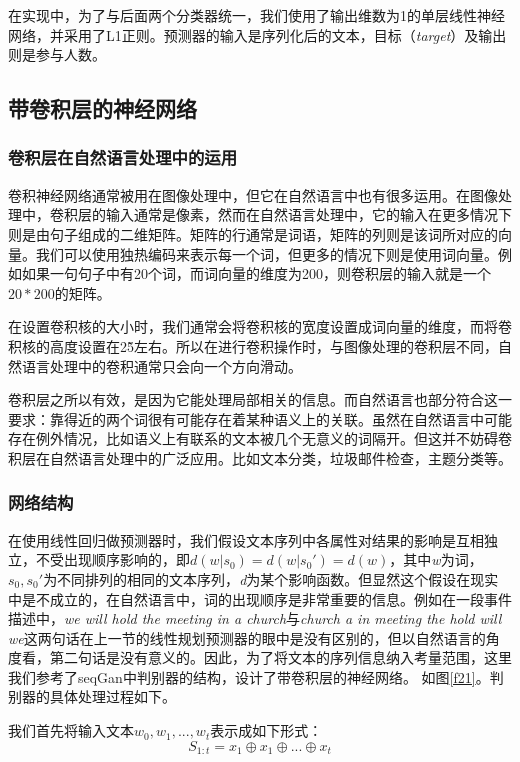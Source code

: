 在实现中，为了与后面两个分类器统一，我们使用了输出维数为1的单层线性神经网络，并采用了L1正则。预测器的输入是序列化后的文本，目标（\textit{target}）及输出则是参与人数。


\subsection{带卷积层的神经网络}
\subsubsection{卷积层在自然语言处理中的运用}
卷积神经网络通常被用在图像处理中，但它在自然语言中也有很多运用。在图像处理中，卷积层的输入通常是像素，然而在自然语言处理中，它的输入在更多情况下则是由句子组成的二维矩阵。矩阵的行通常是词语，矩阵的列则是该词所对应的向量。我们可以使用独热编码来表示每一个词，但更多的情况下则是使用词向量。例如如果一句句子中有20个词，而词向量的维度为200，则卷积层的输入就是一个$20*200$的矩阵。

在设置卷积核的大小时，我们通常会将卷积核的宽度设置成词向量的维度，而将卷积核的高度设置在2\~5左右。所以在进行卷积操作时，与图像处理的卷积层不同，自然语言处理中的卷积通常只会向一个方向滑动。

卷积层之所以有效，是因为它能处理局部相关的信息。而自然语言也部分符合这一要求：靠得近的两个词很有可能存在着某种语义上的关联。虽然在自然语言中可能存在例外情况，比如语义上有联系的文本被几个无意义的词隔开。但这并不妨碍卷积层在自然语言处理中的广泛应用。比如文本分类，垃圾邮件检查，主题分类等。
\subsubsection{网络结构}
在使用线性回归做预测器时，我们假设文本序列中各属性对结果的影响是互相独立，不受出现顺序影响的，即\(d(w|s_0)=d(w|s_0')=d(w)\)，其中\textit{w}为词，\(s_0,s_0'\)为不同排列的相同的文本序列，\textit{d}为某个影响函数。但显然这个假设在现实中是不成立的，在自然语言中，词的出现顺序是非常重要的信息。例如在一段事件描述中，\textit{we will hold the meeting in a church}与\textit{church a in meeting the hold will we}这两句话在上一节的线性规划预测器的眼中是没有区别的，但以自然语言的角度看，第二句话是没有意义的。因此，为了将文本的序列信息纳入考量范围，这里我们参考了seqGan\cite{yu_seqgan:_2016}中判别器的结构，设计了带卷积层的神经网络。
如图\ref{f21}。判别器的具体处理过程如下。

我们首先将输入文本\(w_0,w_1,...,w_t\)表示成如下形式：
\begin{equation}
S_{1:t}=x_1\oplus x_1\oplus...\oplus x_t
\end{equation}

